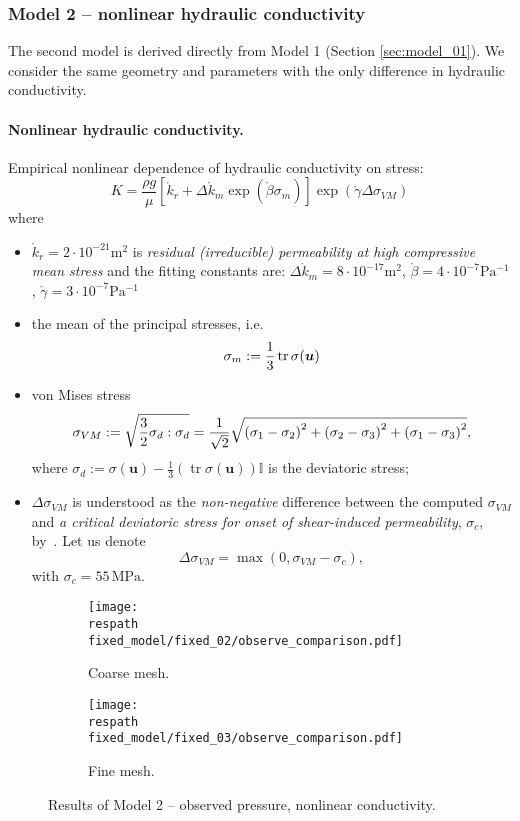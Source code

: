 \documentclass{article}
\def\unit#1{\mathrm{#1}}
\def\tr{\operatorname{tr}}
\def\vc#1{\mathbf{\boldsymbol{#1}}}     %
\def\tn#1{{\mathbb{#1}}}    %
\def\sqr#1{{{\left(#1\right)}^2}}    %
\def\uu{\vc u}
\newcommand{\respath}{results/}
\newcommand{\eq}[1]{\begin{equation}{#1}\end{equation}}
\begin{document}
\subsubsection{Model 2 -- nonlinear hydraulic conductivity}
The second model is derived directly from Model 1 (Section \ref{sec:model_01}).
We consider the same geometry and parameters with the only difference in hydraulic conductivity.

\paragraph{Nonlinear hydraulic conductivity.}
Empirical nonlinear dependence of hydraulic conductivity on stress:
\eq{ K = \frac{\rho g}{\mu} \left[\mathring{k}_r + \Delta \mathring{k}_m\exp(\mathring\beta\sigma_m)\right]\exp(\mathring\gamma\Delta\sigma_{VM}) }
where
\begin{itemize}
    \item $\mathring k_r=2\cdot10^{-21}\unit{m^2}$ is \emph{residual (irreducible) permeability at high compressive mean stress}
    and the fitting constants are: $\Delta \mathring{k}_m=8\cdot10^{-17}\unit{m^2}$,  $\mathring\beta=4\cdot10^{-7}\unit{Pa^{-1}}$, $\mathring\gamma=3\cdot10^{-7}\unit{Pa^{-1}}$
    \item the mean of the principal stresses, i.e.
        \eq{\label{eq:mean_stress} \sigma_m:=\frac13\tr\tn\sigma(\uu)}
    \item von Mises stress
        \eq{\label{eq:von_mises} \sigma_{VM}:=\sqrt{\frac32\tn\sigma_d:\tn\sigma_d} 
            = \frac{1}{\sqrt{2}}\sqrt{\sqr{\sigma_1-\sigma_2}+\sqr{\sigma_2-\sigma_3}+\sqr{\sigma_1-\sigma_3}},}
        where $\tn\sigma_d:=\tn\sigma(\uu)-\frac13(\tr\tn\sigma(\uu))\tn I$ is the deviatoric stress;
    \item $\Delta\sigma_{VM}$ is understood as the \emph{non-negative} difference between the computed $\sigma_{VM}$ and
        \emph{a critical deviatoric stress for onset of shear-induced permeability}, $\sigma_{c}$, by~\cite{rutqvist_fractured_2015}.
        Let us denote
        \eq{\Delta\sigma_{VM} = \max\left(0, \sigma_{VM} - \sigma_{c}\right),}
        with $\sigma_{c}=55\,\unit{MPa}$.
\end{itemize}

\begin{figure}[htb!]
    \centering
    \begin{subfigure}[t]{0.495\textwidth}
      \texttt{[image: \\respath fixed\_model/fixed\_02/observe\_comparison.pdf]}
      \caption{Coarse mesh.}
      \label{fig:mass_mobile_flow123d}
    \end{subfigure}
    \begin{subfigure}[t]{0.495\textwidth}
      \texttt{[image: \\respath fixed\_model/fixed\_03/observe\_comparison.pdf]}
      \caption{Fine mesh.}
      \label{fig:mass_sorbed_flow123d}
    \end{subfigure}
    \caption{Results of Model 2 -- observed pressure, nonlinear conductivity.}
    \label{fig:balance_flow123d}
\end{figure}
\end{document}
